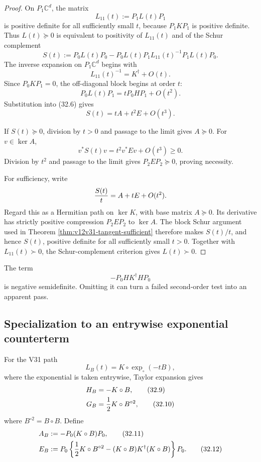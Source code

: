 \documentclass[11pt]{article}
\theoremstyle{remark}
\begin{document}
\begin{proof}
On \(P_1\mathbb C^d\), the matrix
\[
 L_{11}(t):=P_1L(t)P_1
\]
is positive definite for all sufficiently small \(t\), because
\(P_1KP_1\) is positive definite.  Thus \(L(t)\succeq0\) is equivalent
to positivity of \(L_{11}(t)\) and of the Schur complement
\begin{equation}
 S(t):=
 P_0L(t)P_0
 -
 P_0L(t)P_1L_{11}(t)^{-1}P_1L(t)P_0.             \tag{32.6}
\end{equation}
The inverse expansion on \(P_1\mathbb C^d\) begins with
\[
 L_{11}(t)^{-1}=K^\dagger+O(t).
\]
Since \(P_0KP_1=0\), the off-diagonal block begins at order \(t\):
\[
 P_0L(t)P_1=tP_0HP_1+O(t^2).
\]
Substitution into (32.6) gives
\begin{equation}
 S(t)=tA+t^2E+O(t^3).                            \tag{32.7}
 \label{eq:v12v32-schur-expansion}
\end{equation}

If \(S(t)\succeq0\), division by \(t>0\) and passage to the limit
gives \(A\succeq0\).  For \(v\in\ker A\),
\[
 v^*S(t)v=t^2v^*Ev+O(t^3)\geq0.
\]
Division by \(t^2\) and passage to the limit gives
\(P_2EP_2\succeq0\), proving necessity.

For sufficiency, write
\[
 {S(t)\over t}=A+tE+O(t^2).
\]
Regard this as a Hermitian path on \(\ker K\), with base matrix
\(A\succeq0\).  Its derivative has strictly positive compression
\(P_2EP_2\) to \(\ker A\).  The block Schur argument used in Theorem
\ref{thm:v12v31-tangent-sufficient} therefore makes \(S(t)/t\),
and hence \(S(t)\), positive definite for all sufficiently small
\(t>0\).  Together with \(L_{11}(t)\succ0\), the Schur-complement
criterion gives \(L(t)\succ0\).
\end{proof}

The term
\begin{equation}
 -P_0HK^\dagger HP_0                             \tag{32.8}
\end{equation}
is negative semidefinite.  Omitting it can turn a failed
second-order test into an apparent pass.

\subsection{Specialization to an entrywise exponential counterterm}

For the V31 path
\[
 L_B(t)=K\circ\exp_\circ(-tB),
\]
where the exponential is taken entrywise, Taylor expansion gives
\begin{align}
 H_B&=-K\circ B,                                 \tag{32.9}\\
 G_B&={1\over2}K\circ B^{\circ2},                \tag{32.10}
\end{align}
where \(B^{\circ2}=B\circ B\).  Define
\begin{align}
 A_B&:=-P_0(K\circ B)P_0,                        \tag{32.11}\\
 E_B&:=P_0\left\{
 {1\over2}K\circ B^{\circ2}
 -(K\circ B)K^\dagger(K\circ B)
 \right\}P_0.                                    \tag{32.12}
\end{align}
\end{document}
